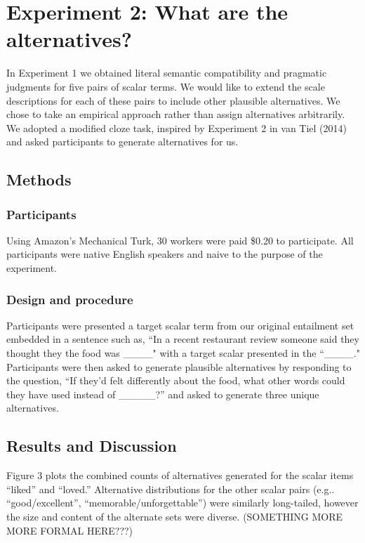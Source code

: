 \documentclass[10pt, letterpaper]{article}
\begin{document}
\section{Experiment 2: What are the
alternatives?}\label{experiment-2-what-are-the-alternatives}

In Experiment 1 we obtained literal semantic compatibility and pragmatic
judgments for five pairs of scalar terms. We would like to extend the
scale descriptions for each of these pairs to include other plausible
alternatives. We chose to take an empirical approach rather than assign
alternatives arbitrarily. We adopted a modified cloze task, inspired by
Experiment 2 in van Tiel (2014) and asked participants to generate
alternatives for us.

\subsection{Methods}\label{methods-1}

\subsubsection{Participants}\label{participants-1}

Using Amazon's Mechanical Turk, 30 workers were paid \$0.20 to
participate. All participants were native English speakers and naive to
the purpose of the experiment.

\subsubsection{Design and procedure}\label{design-and-procedure-1}

Participants were presented a target scalar term from our original
entailment set embedded in a sentence such as, ``In a recent restaurant
review someone said they thought they the food was \_\_\_\_" with a
target scalar presented in the ``\_\_\_\_." Participants were then asked
to generate plausible alternatives by responding to the question, ``If
they'd felt differently about the food, what other words could they have
used instead of \_\_\_\_\_?'' and asked to generate three unique
alternatives.

\subsection{Results and Discussion}\label{results-and-discussion-1}

Figure 3 plots the combined counts of alternatives generated for the
scalar items ``liked'' and ``loved.'' Alternative distributions for the
other scalar pairs (e.g.. ``good/excellent'',
``memorable/unforgettable'') were similarly long-tailed, however the
size and content of the alternate sets were diverse. (SOMETHING MORE
MORE FORMAL HERE???)
\end{document}
